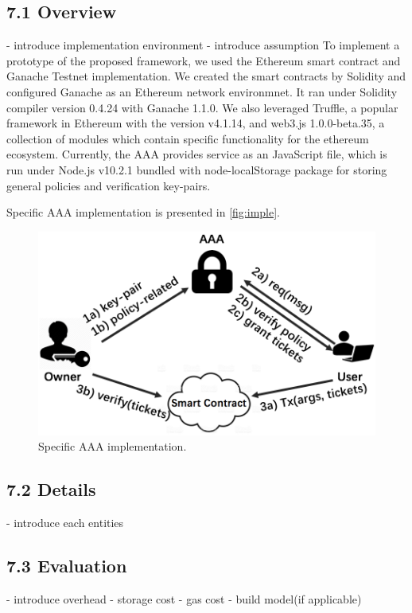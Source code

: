\subsection*{7.1 Overview}
- introduce implementation environment
- introduce assumption
\noindent To implement a prototype of the proposed framework, we used the Ethereum smart contract and Ganache Testnet implementation. We created the smart contracts by Solidity and configured Ganache as an Ethereum network environmnet. It ran under Solidity compiler version 0.4.24 with Ganache 1.1.0. We also leveraged Truffle, a popular framework in Ethereum with the version v4.1.14, and web3.js 1.0.0-beta.35, a collection of modules which contain specific functionality for the ethereum ecosystem. Currently, the AAA provides service as an JavaScript file, which is run under Node.js v10.2.1 bundled with node-localStorage package for storing general policies and verification key-pairs.

Specific AAA implementation is presented in \autoref{fig:imple}.
\begin{figure}[h!]
  \centering
  \includegraphics[width=1.0\linewidth]{fig/imple}
  \caption{Specific AAA implementation.}
  \label{fig:imple}
\end{figure}

\subsection*{7.2 Details}
- introduce each entities 

\subsection*{7.3 Evaluation}
- introduce overhead
- storage cost
- gas cost
- build model(if applicable)


